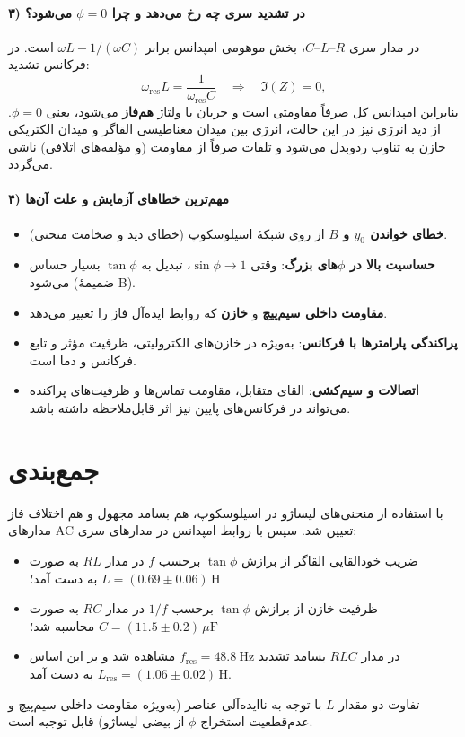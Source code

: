 \documentclass[a4paper, 11pt]{article}
\begin{document}
\paragraph{۳) در تشدید سری چه رخ می‌دهد و چرا \(\phi=0\) می‌شود؟}
در مدار سری \(R\)–\(L\)–\(C\)، بخش موهومی امپدانس برابر \(\omega L-1/(\omega C)\) است. در فرکانس تشدید:
\[
\omega_{\mathrm{res}}L=\frac{1}{\omega_{\mathrm{res}}C}\quad\Rightarrow\quad \Im(Z)=0,
\]
بنابراین امپدانس کل صرفاً مقاومتی است و جریان با ولتاژ \textbf{هم‌فاز} می‌شود، یعنی \(\phi=0\). از دید انرژی نیز در این حالت، انرژی بین میدان مغناطیسی القاگر و میدان الکتریکی خازن به تناوب ردوبدل می‌شود و تلفات صرفاً از مقاومت (و مؤلفه‌های اتلافی) ناشی می‌گردد.

\paragraph{۴) مهم‌ترین خطاهای آزمایش و علت آن‌ها}
\begin{itemize}
    \item \textbf{خطای خواندن \(y_0\) و \(B\)} از روی شبکهٔ اسیلوسکوپ (خطای دید و ضخامت منحنی).
    \item \textbf{حساسیت بالا در \(\phi\)‌های بزرگ}: وقتی \(\sin\phi\to 1\)، تبدیل به \(\tan\phi\) بسیار حساس می‌شود (ضمیمهٔ B).
    \item \textbf{مقاومت داخلی سیم‌پیچ} و \textbf{ خازن} که روابط ایده‌آل فاز را تغییر می‌دهد.
    \item \textbf{پراکندگی پارامترها با فرکانس}: به‌ویژه در خازن‌های الکترولیتی، ظرفیت مؤثر و  تابع فرکانس و دما است.
    \item \textbf{اتصالات و سیم‌کشی}: القای متقابل، مقاومت تماس‌ها و ظرفیت‌های پراکنده می‌تواند در فرکانس‌های پایین نیز اثر قابل‌ملاحظه داشته باشد.
\end{itemize}


\section*{جمع‌بندی}

با استفاده از منحنی‌های لیساژو در اسیلوسکوپ، هم بسامد مجهول و هم اختلاف فاز مدارهای AC تعیین شد. سپس با روابط امپدانس در مدارهای سری:
\begin{itemize}
    \item ضریب خودالقایی القاگر از برازش \(\tan\phi\) برحسب \(f\) در مدار $RL$ به صورت \(L=(0.69\pm 0.06)\,\mathrm{H}\) به دست آمد؛
    \item ظرفیت خازن از برازش \(\tan\phi\) برحسب \(1/f\) در مدار $RC$ به صورت \(C=(11.5\pm 0.2)\,\mu\mathrm{F}\) محاسبه شد؛
    \item در مدار $RLC$ بسامد تشدید \(f_{\mathrm{res}}=48.8~\mathrm{Hz}\) مشاهده شد و بر این اساس \(L_{\mathrm{res}}=(1.06\pm 0.02)\,\mathrm{H}\) به دست آمد.
\end{itemize}
تفاوت دو مقدار \(L\) با توجه به ناایده‌آلی عناصر (به‌ویژه مقاومت داخلی سیم‌پیچ و عدم‌قطعیت استخراج \(\phi\) از بیضی لیساژو) قابل توجیه است.
\end{document}
